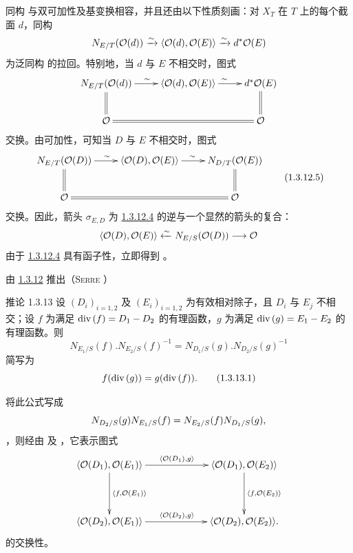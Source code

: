 同构  与双可加性及基变换相容，并且还由以下性质刻画：对 $X_{T}$ 在 $T$ 上的每个\pageoriginale 截面 $d$，同构 $$
N_{E/T}({\mathcal O}(d))\xrightarrow{\sim}\langle {\mathcal O}(d),{\mathcal O}(E)\rangle
\xrightarrow{\sim} d^{\ast}{\mathcal O}(E)
$$ 为泛同构  的拉回。特别地，当 $d$ 与 $E$ 不相交时，图式 $$
\xymatrix{
N_{E/T}(\Oo(d))  \ar[r]^{\sim} \ar@{=}[d]& \langle \Oo(d), \Oo(E)\rangle 
\ar[r]^{\sim} & d^\ast\Oo(E) \ar@{=}[d]\\
\Oo              \ar@{=}[rr] &          & \Oo  
}
$$ 交换。由可加性，可知当 $D$ 与 $E$ 不相交时，图式 \begin{equation*}
\vcenter{
\xymatrix{
N_{E/T}(\Oo(D))  \ar[r]^{\sim} \ar@{=}[d]& \langle \Oo(D), \Oo(E)\rangle 
\ar[r]^{\sim} & N_{D/T}(\Oo(E)) \ar@{=}[d]\\
\Oo              \ar@{=}[rr] &          & \Oo  
}}\tag{1.3.12.5}
\end{equation*} 交换。因此，箭头 $\sigma_{E,D}$ 为 \hyperref[XVIII.eq1.3.12.4]{1.3.12.4} 的逆与一个显然的箭头的复合： $$
\langle {\mathcal O}(D),{\mathcal O}(E)\rangle \xleftarrow{\sim} N_{E/S}({\mathcal O}(D))\longrightarrow
{\mathcal O}
$$ 由于 \hyperref[XVIII.eq1.3.12.4]{1.3.12.4} 具有函子性，立即得到 。

由 \hyperref[XVIII.prop1.3.12]{1.3.12} 推出（\cf \textsc{Serre} \cite[Ch.~III, prop.~7, p.~46]{sga4.exp.XVIII.bib.6}）

\begin{enonce*}{推论 1.3.13} 设 $(D_{i})_{i=1,2}$ 及 $(E_{i})_{i=1,2}$ 为有效相对除子，且 $D_{i}$ 与 $E_{j}$ 不相交；设 $f$ 为满足 $\text{\rm div\,}(f)=D_{1}-D_{2}$ 的有理函数，$g$ 为满足 $\text{\rm div\,}(g)=E_{1}-E_{2}$ 的有理函数。则 $$
N_{E_{1}/S}(f).N_{E_{2}/S}(f)^{-1}=N_{D_{1}/S}(g).N_{D_{2}/S}(g)^{-1}
$$ 简写为 \begin{equation*}
f(\text{\rm div\,}(g))=g(\text{\rm div\,}(f)){}.\tag{1.3.13.1}
\end{equation*} \end{enonce*}

将此公式写成 $$
N_{D_{2}/S}(g)N_{E_{1}/S}(f)=N_{E_{2}/S}(f)N_{D_{1}/S}(g){},
$$，则经由  及 ，它表示图式 $$
\xymatrix@C=2.25cm@R=1.5cm{
\langle \Oo(D_1), \Oo(E_1)\rangle   \ar[r]^{\langle \Oo(D_1), g\rangle } \ar[d]^{\langle f,\Oo(E_1)\rangle }&
\langle \Oo(D_1),\Oo(E_2)\rangle  \ar[d]^{\langle f,\Oo(E_2)\rangle }\\
\langle \Oo(D_2), \Oo(E_1)\rangle   \ar[r]^{\langle \Oo(D_2),g\rangle } & \langle \Oo(D_2), \Oo(E_2)\rangle .
}
$$ 的交换性。

